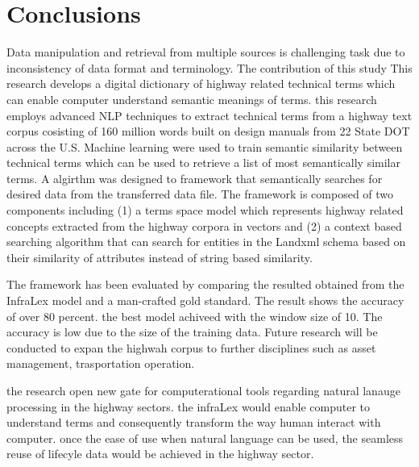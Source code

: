 \documentclass[Journal, InsideFigs, DoubleSpace]{ascelike} %
\begin{document}
\section{Conclusions} \label{sec:conclns} 
Data manipulation and retrieval from multiple sources is challenging task due to inconsistency of data format and terminology. The contribution of this study This research develops a digital dictionary of  highway related technical terms which can enable computer understand semantic meanings of terms.  this research employs advanced NLP techniques to extract technical terms from a highway text corpus cosisting of 160 million words built on design manuals from 22 State DOT across the U.S. Machine learning were used to train semantic similarity between technical terms which can be used to retrieve a list of most semantically similar terms.  A algirthm was designed to framework that semantically searches for desired data from the transferred data file. The framework is composed of two components including (1) a terms space model which represents highway related concepts extracted from the highway corpora in vectors and (2) a context based searching algorithm that can search for entities in the Landxml schema based on their similarity of attributes instead of string based similarity.
\par
The framework has been evaluated by comparing the resulted obtained from the InfraLex model and a man-crafted gold standard. The result shows the accuracy of over 80 percent.  the best model achiveed with the window size of 10. The accuracy is low due to the size of the training data. Future research will be conducted to expan the highwah corpus to further disciplines such as asset management, trasportation operation. 
\par
the research open new gate for computerational tools regarding natural lanauge processing in the highway sectors. the infraLex would enable computer to understand terms and consequently transform the way human interact with computer. once the ease of use when natural language can be used, the seamless reuse of lifecyle data would be achieved in the highway sector. 


%
%
\end{document}
